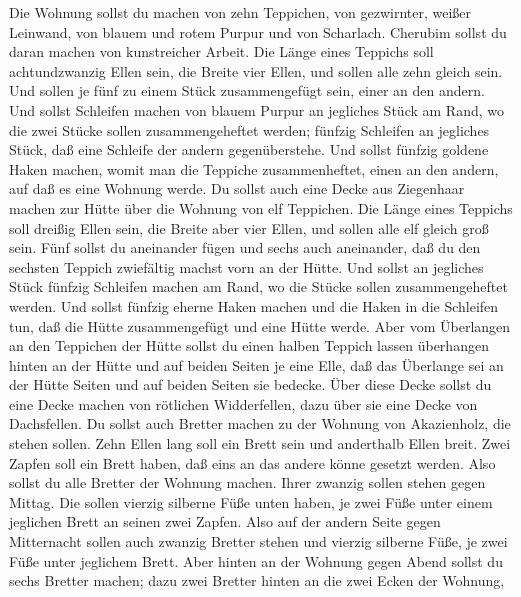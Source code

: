  Die Wohnung sollst du machen von zehn Teppichen, von
gezwirnter, weißer Leinwand, von blauem und rotem Purpur und von
Scharlach. Cherubim sollst du daran machen von kunstreicher Arbeit.
 Die Länge eines Teppichs soll achtundzwanzig Ellen sein,
die Breite vier Ellen, und sollen alle zehn gleich sein. 
Und sollen je fünf zu einem Stück zusammengefügt sein, einer an den
andern.  Und sollst Schleifen machen von blauem Purpur an
jegliches Stück am Rand, wo die zwei Stücke sollen zusammengeheftet
werden;  fünfzig Schleifen an jegliches Stück, daß eine
Schleife der andern gegenüberstehe.  Und sollst fünfzig
goldene Haken machen, womit man die Teppiche zusammenheftet, einen an
den andern, auf daß es eine Wohnung werde.  Du sollst auch
eine Decke aus Ziegenhaar machen zur Hütte über die Wohnung von elf
Teppichen.  Die Länge eines Teppichs soll dreißig Ellen
sein, die Breite aber vier Ellen, und sollen alle elf gleich groß sein.
 Fünf sollst du aneinander fügen und sechs auch aneinander,
daß du den sechsten Teppich zwiefältig machst vorn an der Hütte.
 Und sollst an jegliches Stück fünfzig Schleifen machen am
Rand, wo die Stücke sollen zusammengeheftet werden.  Und
sollst fünfzig eherne Haken machen und die Haken in die Schleifen tun,
daß die Hütte zusammengefügt und eine Hütte werde.  Aber
vom Überlangen an den Teppichen der Hütte sollst du einen halben Teppich
lassen überhangen hinten an der Hütte  und auf beiden
Seiten je eine Elle, daß das Überlange sei an der Hütte Seiten und auf
beiden Seiten sie bedecke.  Über diese Decke sollst du eine
Decke machen von rötlichen Widderfellen, dazu über sie eine Decke von
Dachsfellen.  Du sollst auch Bretter machen zu der Wohnung
von Akazienholz, die stehen sollen.  Zehn Ellen lang soll
ein Brett sein und anderthalb Ellen breit.  Zwei Zapfen
soll ein Brett haben, daß eins an das andere könne gesetzt werden. Also
sollst du alle Bretter der Wohnung machen.  Ihrer zwanzig
sollen stehen gegen Mittag.  Die sollen vierzig silberne
Füße unten haben, je zwei Füße unter einem jeglichen Brett an seinen
zwei Zapfen.  Also auf der andern Seite gegen Mitternacht
sollen auch zwanzig Bretter stehen  und vierzig silberne
Füße, je zwei Füße unter jeglichem Brett.  Aber hinten an
der Wohnung gegen Abend sollst du sechs Bretter machen; 
dazu zwei Bretter hinten an die zwei Ecken der Wohnung, 
